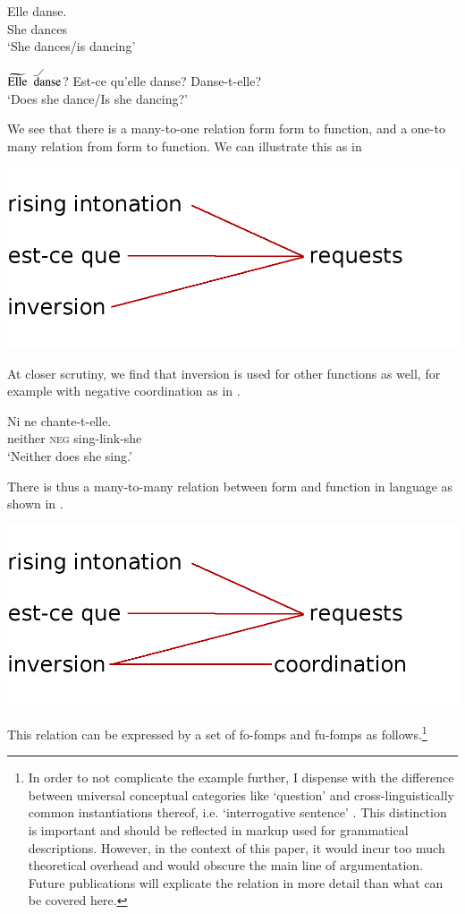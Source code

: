 \documentclass[a4paper,12pt]{article}
\begin{document}
\ea\label{ex:frenchquestions:assertion}
\gll Elle danse.\\
     She dances\\
    `She dances/is dancing'
\z
 
\ea\label{ex:frenchquestions}
\ea $\widetilde{\rm Elle}$ $\stackrel{\_\diagup\hspace{.5cm}}{\rm danse}$?
\ex Est-ce qu'elle danse?
\ex Danse-t-elle?\\
 `Does she dance/Is she dancing?'
\z
\z

We see that there is a many-to-one relation form form to function, and a one-to many relation from form to function. We can illustrate this as in 

\ea\label{ex:fufofomp:intro} \includegraphics[width=.6\textwidth]{fufofomp0}\z

At closer scrutiny, we find that inversion is used for other functions as well, for example with negative coordination as in .

\ea\label{ex:french:negativecoordination}
\gll Ni ne chante-t-elle.\\
     neither \textsc{neg} sing-link-she\\
     `Neither does she sing.'
\z

There is thus a many-to-many relation between form and function in language \citep{Noonan2006} as shown in .
 
\ea\label{ex:fufofomp:outro} \includegraphics[width=.6\textwidth]{fufofomp}\z

This relation can be expressed by a set of fo-fomps and fu-fomps as follows.\footnote{In order to not complicate the example further, I dispense with the difference between universal conceptual categories like `question' and cross-linguistically common instantiations thereof, i.e. `interrogative sentence' \citep[but see][]{Lehmann1993}. This distinction is important and should be reflected in markup used for grammatical descriptions. However, in the context of this paper, it would incur too much theoretical overhead and would obscure the main line of argumentation. Future publications will explicate the relation in more detail than what can be covered here.}
\end{document}

